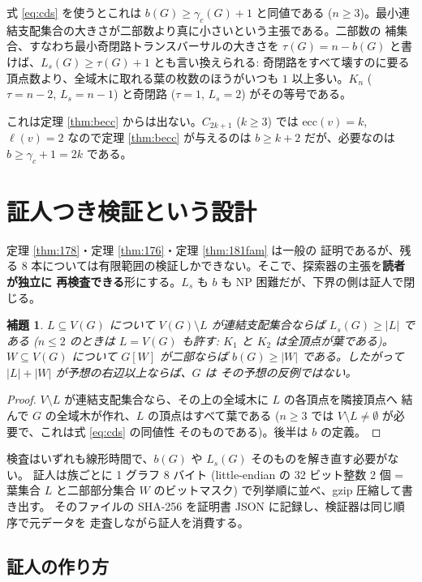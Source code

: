 \documentclass[paper=a4,fontsize=10.5pt,jafontsize=10.5pt]{jlreq}
\theoremstyle{plain}
\newtheorem{lemma}[theorem]{補題}
\theoremstyle{definition}
\begin{document}
式 \eqref{eq:cds} を使うとこれは $b(G) \ge \gamma_c(G) + 1$ と同値である
($n \ge 3$)。最小連結支配集合の大きさが二部数より真に小さいという主張である。二部数の
補集合、すなわち最小奇閉路トランスバーサルの大きさを
$\tau(G) = n - b(G)$ と書けば、$L_s(G) \ge \tau(G) + 1$ とも言い換えられる:
奇閉路をすべて壊すのに要る頂点数より、全域木に取れる葉の枚数のほうがいつも
$1$ 以上多い。$K_n$ ($\tau = n-2$, $L_s = n-1$) と奇閉路 ($\tau = 1$,
$L_s = 2$) がその等号である。

これは定理 \ref{thm:becc} からは出ない。$C_{2k+1}$ ($k \ge 3$) では
$\mathrm{ecc}(v) = k$, $\ell(v) = 2$ なので定理 \ref{thm:becc} が与えるのは
$b \ge k + 2$ だが、必要なのは $b \ge \gamma_c + 1 = 2k$ である。

\section{証人つき検証という設計}\label{sec:design}

定理 \ref{thm:178}・定理 \ref{thm:176}・定理 \ref{thm:181fam} は一般の
証明であるが、残る 8 本については有限範囲の検証しかできない。そこで、探索器の主張を\textbf{読者が独立に
再検査できる}形にする。$L_s$ も $b$ も NP 困難だが、下界の側は証人で閉じる。

\begin{lemma}\label{lem:witness}
$L \subseteq V(G)$ について $V(G) \setminus L$ が連結支配集合ならば
$L_s(G) \ge |L|$ である ($n \le 2$ のときは $L = V(G)$ も許す: $K_1$ と $K_2$
は全頂点が葉である)。$W \subseteq V(G)$ について $G[W]$ が二部ならば
$b(G) \ge |W|$ である。したがって $|L| + |W|$ が予想の右辺以上ならば、$G$ は
その予想の反例ではない。
\end{lemma}

\begin{proof}
$V \setminus L$ が連結支配集合なら、その上の全域木に $L$ の各頂点を隣接頂点へ
結んで $G$ の全域木が作れ、$L$ の頂点はすべて葉である ($n \ge 3$ では
$V \setminus L \ne \emptyset$ が必要で、これは式 \eqref{eq:cds} の同値性
そのものである)。後半は $b$ の定義。
\end{proof}

検査はいずれも線形時間で、$b(G)$ や $L_s(G)$ そのものを解き直す必要がない。
証人は族ごとに 1 グラフ 8 バイト (little-endian の 32 ビット整数 2 個 = 葉集合
$L$ と二部部分集合 $W$ のビットマスク) で列挙順に並べ、gzip 圧縮して書き出す。
そのファイルの SHA-256 を証明書 JSON に記録し、検証器は同じ順序で元データを
走査しながら証人を消費する。

\subsection{証人の作り方}
\end{document}
